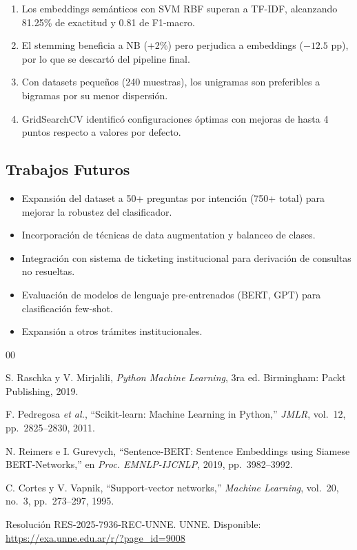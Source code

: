 \documentclass[conference, a4paper]{IEEEtran}
\begin{document}
\begin{enumerate}
    \item Los embeddings sem\'anticos con SVM RBF superan a TF-IDF, 
          alcanzando 81.25\% de exactitud y 0.81 de F1-macro.
    \item El stemming beneficia a NB (+2\%) pero perjudica a embeddings 
          ($-12.5$ pp), por lo que se descart\'o del pipeline final.
    \item Con datasets peque\~nos (240 muestras), los unigramas son 
          preferibles a bigramas por su menor dispersi\'on.
    \item GridSearchCV identific\'o configuraciones \'optimas con mejoras 
          de hasta 4 puntos respecto a valores por defecto.
\end{enumerate}

\subsection{Trabajos Futuros}

\begin{itemize}
    \item Expansi\'on del dataset a 50+ preguntas por intenci\'on (750+ 
          total) para mejorar la robustez del clasificador.
    \item Incorporaci\'on de t\'ecnicas de data augmentation y balanceo 
          de clases.
    \item Integraci\'on con sistema de ticketing institucional para 
          derivaci\'on de consultas no resueltas.
    \item Evaluaci\'on de modelos de lenguaje pre-entrenados (BERT, GPT) 
          para clasificaci\'on few-shot.
    \item Expansi\'on a otros tr\'amites institucionales.
\end{itemize}

\begin{thebibliography}{00}

 S. Raschka y V. Mirjalili, \emph{Python Machine 
Learning}, 3ra ed. Birmingham: Packt Publishing, 2019.

 F. Pedregosa \emph{et al.}, ``Scikit-learn: Machine 
Learning in Python,'' \emph{JMLR}, vol.~12, pp.~2825--2830, 2011.

 N. Reimers e I. Gurevych, ``Sentence-BERT: 
Sentence Embeddings using Siamese BERT-Networks,'' en \emph{Proc. 
EMNLP-IJCNLP}, 2019, pp.~3982--3992.

 C. Cortes y V. Vapnik, ``Support-vector networks,'' 
\emph{Machine Learning}, vol.~20, no.~3, pp.~273--297, 1995.

 Resoluci\'on RES-2025-7936-REC-UNNE. UNNE. Disponible: 
\url{https://exa.unne.edu.ar/r/?page_id=9008}

\end{thebibliography}
\end{document}
